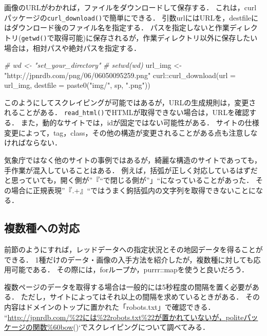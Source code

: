 \documentclass[
]{article}
\newenvironment{Shaded}{\begin{snugshade}}{\end{snugshade}}
\newcommand{\AttributeTok}[1]{\textcolor[rgb]{0.77,0.63,0.00}{#1}}
\newcommand{\CommentTok}[1]{\textcolor[rgb]{0.56,0.35,0.01}{\textit{#1}}}
\newcommand{\FunctionTok}[1]{\textcolor[rgb]{0.00,0.00,0.00}{#1}}
\newcommand{\NormalTok}[1]{#1}
\newcommand{\OtherTok}[1]{\textcolor[rgb]{0.56,0.35,0.01}{#1}}
\newcommand{\SpecialCharTok}[1]{\textcolor[rgb]{0.00,0.00,0.00}{#1}}
\newcommand{\StringTok}[1]{\textcolor[rgb]{0.31,0.60,0.02}{#1}}
\begin{document}
画像のURLがわかれば，ファイルをダウンロードして保存する．
これは，curlパッケージの\texttt{curl\_download()}で簡単にできる．
引数urlにはURLを，destfileにはダウンロード後のファイル名を指定する．
パスを指定しないと作業ディレクトリ(\texttt{getwd()}で取得可能)に保存されるが，作業ディレクトリ以外に保存したい場合は，相対パスや絶対パスを指定する．

\begin{Shaded}
\begin{Highlighting}[]
  \CommentTok{\# wd \textless{}{-} "set\_your\_directory"}
  \CommentTok{\# setwd(wd)}
\NormalTok{url\_img }\OtherTok{\textless{}{-}} \StringTok{"http://jpnrdb.com/png/06/06050095259.png"}
\NormalTok{curl}\SpecialCharTok{::}\FunctionTok{curl\_download}\NormalTok{(}\AttributeTok{url =}\NormalTok{ url\_img, }\AttributeTok{destfile =} \FunctionTok{paste0}\NormalTok{(}\StringTok{"img/"}\NormalTok{, sp, }\StringTok{".png"}\NormalTok{))}
\end{Highlighting}
\end{Shaded}

このようにしてスクレイピングが可能ではあるが，URLの生成規則は，変更されることがある．
\texttt{read\_html()}でHTMLが取得できない場合は，URLを確認する．
また，動的なサイトでは，idが固定ではない可能性がある．
サイトの仕様変更によって，tag，class，その他の構造が変更されることがある点も注意しなければならない．

気象庁ではなく他のサイトの事例ではあるが，綺麗な構造のサイトであっても，手作業が混入していることはある．
例えば，括弧が正しく対応しているはずだと思っていても，開く側が''『``で閉じる側が''」``になっていることがあった．
その場合に正規表現''『.+』``ではうまく鉤括弧内の文字列を取得できないことになる．

\hypertarget{ux8907ux6570ux7a2eux3078ux306eux5bfeux5fdc}{%
\subsection{複数種への対応}\label{ux8907ux6570ux7a2eux3078ux306eux5bfeux5fdc}}

前節のようにすれば，レッドデータへの指定状況とその地図データを得ることができる．
1種だけのデータ・画像の入手方法を紹介したが，複数種に対しても応用可能である．
その際には，forループか，purrr::mapを使うと良いだろう．

複数ページのデータを取得する場合は一般的には5秒程度の間隔を置く必要がある．
ただし，サイトによってはそれ以上の間隔を求めているときがある．
その内容はドメインのトップに置かれた「robots.txt」で確認できる．
``\url{http://jpnrdb.com/\%22には\%22robots.txt\%22が置かれていないが，politeパッケージの関数\%60bow}()`でスクレイピングについて調べてみる．
\end{document}
